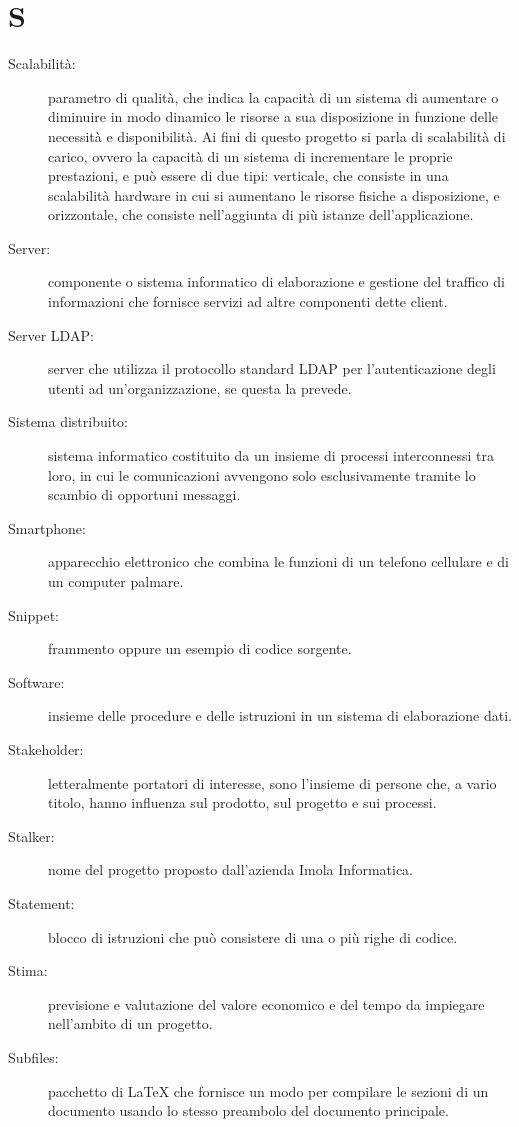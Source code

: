 \documentclass{article}
\begin{document}
  \section{S}
  \begin{description}
    \item[Scalabilità:] parametro di qualità, che indica la capacità di un sistema di aumentare o diminuire in modo dinamico le risorse a sua disposizione in funzione delle necessità e disponibilità. Ai fini di questo progetto si parla di scalabilità di carico, ovvero la capacità di un sistema di incrementare le proprie prestazioni, e può essere di due tipi: verticale, che consiste in una scalabilità hardware in cui si aumentano le risorse fisiche a disposizione, e orizzontale, che consiste nell'aggiunta di più istanze dell'applicazione.
    \item[Server:] componente o sistema informatico di elaborazione e gestione del traffico di informazioni che fornisce servizi ad altre componenti dette client.
    \item[Server LDAP:] server che utilizza il protocollo standard LDAP per l'autenticazione degli utenti ad un'organizzazione, se questa la prevede.
    \item[Sistema distribuito:] sistema informatico costituito da un insieme di processi interconnessi tra loro, in cui le comunicazioni avvengono solo esclusivamente tramite lo scambio di opportuni messaggi.
    \item[Smartphone:] apparecchio elettronico che combina le funzioni di un telefono cellulare e di un computer palmare.
    \item[Snippet:] frammento oppure un esempio di codice sorgente.
    \item[Software:] insieme delle procedure e delle istruzioni in un sistema di elaborazione dati.
    \item[Stakeholder:] letteralmente portatori di interesse, sono l’insieme di persone che, a vario titolo, hanno influenza sul prodotto, sul progetto e sui processi.
    \item[Stalker:] nome del progetto proposto dall'azienda Imola Informatica.
    \item[Statement:] blocco di istruzioni che può consistere di una o più righe di codice.
    \item[Stima:] previsione e valutazione del valore economico e del tempo da impiegare nell'ambito di un progetto.
    \item[Subfiles:] pacchetto di LaTeX che fornisce un modo per compilare le sezioni di un documento usando lo stesso preambolo del documento principale.

  \end{description}
  \newpage
\end{document}

